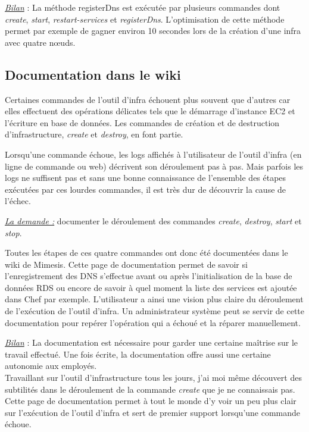 \underline{\textit{Bilan}} : La méthode registerDns est exécutée par plusieurs commandes
dont \textit{create}, \textit{start}, \textit{restart-services} et
\textit{registerDns}. L'optimisation de cette méthode permet par exemple de
gagner environ 10 secondes lors de la création d'une infra avec quatre nœuds.

\subsection{Documentation dans le wiki}

Certaines commandes de l'outil d'infra échouent plus souvent que
d'autres car elles effectuent des opérations délicates tels que le démarrage
d'instance EC2 et l'écriture en base de données. Les commandes de création et de
destruction d'infrastructure, \textit{create} et \textit{destroy}, en font
partie.

Lorsqu'une commande échoue, les logs affichés à l'utilisateur de l'outil d'infra
(en ligne de commande ou web) décrivent son déroulement pas à pas. Mais parfois
les logs ne suffisent pas et sans une bonne connaissance de l'ensemble des
étapes exécutées par ces lourdes commandes, il est très dur de découvrir la
cause de l'échec.

\underline{\textit{La demande :}} documenter le déroulement des commandes \textit{create},
\textit{destroy}, \textit{start} et \textit{stop}.

Toutes les étapes de ces quatre commandes ont donc été documentées dans le wiki
de Mimesis. Cette page de documentation permet de savoir si l'enregistrement des
DNS s'effectue avant ou après l'initialisation de la base de données RDS ou
encore de savoir à quel moment la liste des services est ajoutée dans Chef par
exemple.
L'utilisateur a ainsi une vision plus claire du déroulement de l'exécution de
l'outil d'infra.
Un administrateur système peut se servir de cette documentation pour repérer
l'opération qui a échoué et la réparer manuellement.

\underline{\textit{Bilan}} : La documentation est nécessaire pour garder une certaine
maîtrise sur le travail effectué. Une fois écrite, la documentation offre aussi
une certaine autonomie aux employés. \\
Travaillant sur l'outil d'infrastructure tous les jours, j'ai moi même découvert
des subtilités dans le déroulement de la commande \textit{create} que je ne
connaissais pas. Cette page de documentation permet à tout le monde d'y voir
un peu plus clair sur l'exécution de l'outil d'infra et sert de premier support
lorsqu'une commande échoue.


